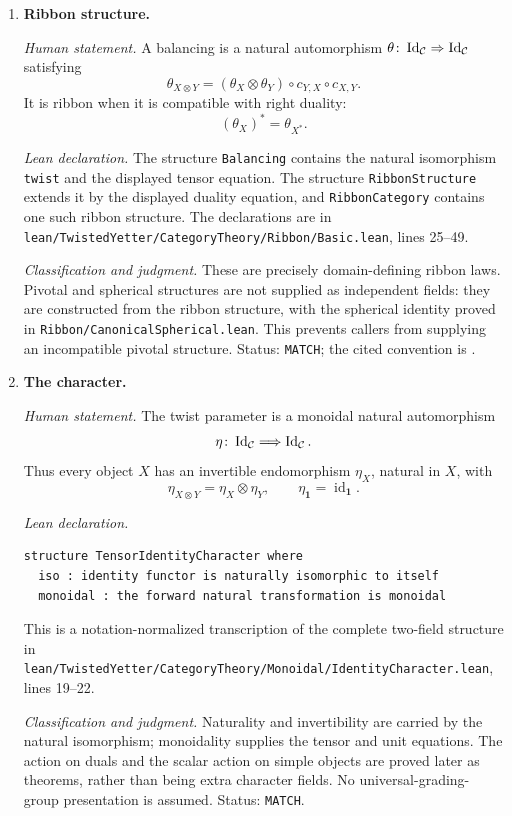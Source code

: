\begin{enumerate}[label=\textbf{A\arabic*.},leftmargin=*]
\item \textbf{Ribbon structure.}

\emph{Human statement.}
A balancing is a natural automorphism
$\theta\colon\operatorname{Id}_{\mathcal{C}}\Rightarrow
\operatorname{Id}_{\mathcal{C}}$ satisfying
\[
 \theta_{X\otimes Y}
 =(\theta_X\otimes\theta_Y)\circ c_{Y,X}\circ c_{X,Y}.
\]
It is ribbon when it is compatible with right duality:
\[
 (\theta_X)^*=\theta_{X^*}.
\]

\emph{Lean declaration.}
The structure \texttt{Balancing} contains the natural isomorphism
\texttt{twist} and the displayed tensor equation.  The structure
\texttt{RibbonStructure} extends it by the displayed duality equation, and
\texttt{RibbonCategory} contains one such ribbon structure.  The declarations
are in \nolinkurl{lean/TwistedYetter/CategoryTheory/Ribbon/Basic.lean}, lines
25--49.

\emph{Classification and judgment.}
These are precisely domain-defining ribbon laws.  Pivotal and spherical
structures are not supplied as independent fields: they are constructed from
the ribbon structure, with the spherical identity proved in
\nolinkurl{Ribbon/CanonicalSpherical.lean}.  This prevents callers from supplying
an incompatible pivotal structure.  Status: \texttt{MATCH}; the cited
convention is \cite[Definition~8.10.1 and Proposition~8.10.12]{EGNO2015}.

\item \textbf{The character.}

\emph{Human statement.}
The twist parameter is a monoidal natural automorphism
\[
 \eta\colon\operatorname{Id}_{\mathcal{C}}\Longrightarrow
 \operatorname{Id}_{\mathcal{C}}.
\]
Thus every object $X$ has an invertible endomorphism $\eta_X$, natural in
$X$, with
\[
 \eta_{X\otimes Y}=\eta_X\otimes\eta_Y,
 \qquad \eta_{\mathbf 1}=\operatorname{id}_{\mathbf 1}.
\]

\emph{Lean declaration.}
\begin{verbatim}
structure TensorIdentityCharacter where
  iso : identity functor is naturally isomorphic to itself
  monoidal : the forward natural transformation is monoidal
\end{verbatim}
This is a notation-normalized transcription of the complete two-field
structure in
\nolinkurl{lean/TwistedYetter/CategoryTheory/Monoidal/IdentityCharacter.lean},
lines 19--22.

\emph{Classification and judgment.}
Naturality and invertibility are carried by the natural isomorphism;
monoidality supplies the tensor and unit equations.  The action on duals and
the scalar action on simple objects are proved later as theorems, rather than
being extra character fields.  No universal-grading-group presentation is
assumed.  Status: \texttt{MATCH}.


\end{enumerate}

